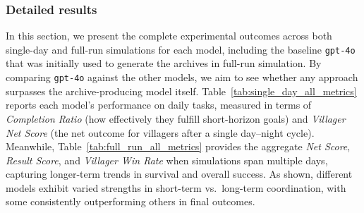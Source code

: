 \subsubsection{Detailed results}
In this section, we present the complete experimental outcomes across both single-day 
and full-run simulations for each model, including the baseline \texttt{gpt-4o} that was 
initially used to generate the archives in full-run simulation. By comparing \texttt{gpt-4o} against the other 
models, we aim to see whether any approach surpasses the archive-producing model itself. 
Table~\ref{tab:single_day_all_metrics} reports each model’s performance on daily tasks, 
measured in terms of \emph{Completion Ratio} (how effectively they fulfill short-horizon 
goals) and \emph{Villager Net Score} (the net outcome for villagers after a single day--night cycle). 
Meanwhile, Table~\ref{tab:full_run_all_metrics} provides the aggregate \emph{Net Score}, 
\emph{Result Score}, and \emph{Villager Win Rate} when simulations span multiple days, 
capturing longer-term trends in survival and overall success. As shown, different models 
exhibit varied strengths in short-term vs.\ long-term coordination, with some consistently 
outperforming others in final outcomes.
\begin{table}[htbp]
\centering
{}
\caption{Single-Day Simulation metrics for each model: completion ratio, villager net score.}
\label{tab:single_day_all_metrics}
\end{table}

\begin{table}[htbp]
\centering
{}
\caption{Full-Run Simulation metrics for each model: net score, result score, and villager win rate.}
\label{tab:full_run_all_metrics}
\end{table}

